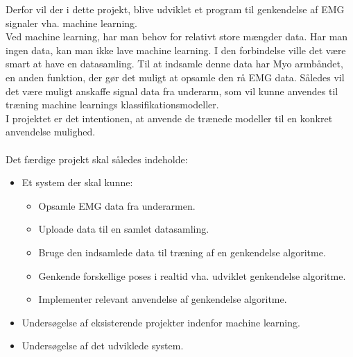Derfor vil der i dette projekt, blive udviklet et program til genkendelse af EMG signaler vha. machine learning. \\
Ved machine learning, har man behov for relativt store mængder data. Har man ingen data, kan man ikke lave machine learning. I den forbindelse ville det være smart at have en datasamling. Til at indsamle denne data har Myo armbåndet, en anden funktion, der gør det muligt at opsamle den rå EMG data. Således vil det være muligt anskaffe signal data fra underarm, som vil kunne anvendes til træning machine learnings klassifikationsmodeller. \\
I projektet er det intentionen, at anvende de trænede modeller til en konkret anvendelse mulighed. \\\\
Det færdige projekt skal således indeholde:
\begin{itemize}
\item Et system der skal kunne:
	\begin{itemize}
		\item Opsamle EMG data fra underarmen.
		\item Uploade data til en samlet datasamling.
		\item Bruge den indsamlede data til træning af en genkendelse algoritme.
		\item Genkende forskellige poses i realtid vha. udviklet genkendelse algoritme.
		\item Implementer relevant anvendelse af genkendelse algoritme.
	\end{itemize}
\item Undersøgelse af eksisterende projekter indenfor machine learning.
\item Undersøgelse af det udviklede system.
\end{itemize}
